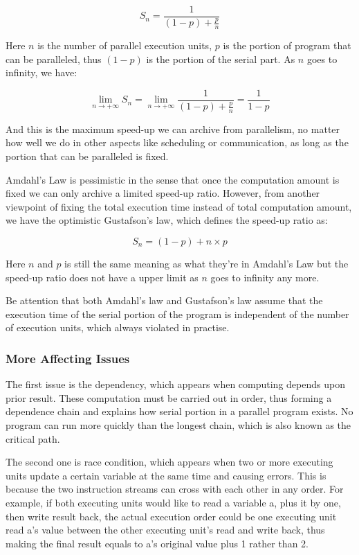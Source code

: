 \documentclass[12pt,a4paper]{report}
\begin{document}
$$ S_n = \frac{1}{(1 - p) + \frac{p}{n}} $$

Here $n$ is the number of parallel execution units, $p$ is the portion of program that can be paralleled, thus $(1-p)$ is the portion of the serial part. As $n$ goes to infinity, we have:

$$ \lim_{n \to +\infty} S_n = \lim_{n \to +\infty} \frac{1}{(1 - p) + \frac{p}{n}} = \frac{1}{1 - p} $$

And this is the maximum speed-up we can archive from parallelism, no matter how well we do in other aspects like scheduling or communication, as long as the portion that can be paralleled is fixed.

Amdahl's Law is pessimistic in the sense that once the computation amount is fixed we can only archive a limited speed-up ratio. However, from another viewpoint of fixing the total execution time instead of total computation amount, we have the optimistic Gustafson's law, which defines the speed-up ratio as:

$$ S_n = (1 - p) + n \times p $$

Here $n$ and $p$ is still the same meaning as what they're in Amdahl's Law but the speed-up ratio does not have a upper limit as $n$ goes to infinity any more.

Be attention that both Amdahl's law and Gustafson's law assume that the execution time of the serial portion of the program is independent of the number of execution units, which always violated in practise.

\subsubsection{More Affecting Issues}

The first issue is the dependency, which appears when computing depends upon prior result. These computation must be carried out in order, thus forming a dependence chain and explains how serial portion in a parallel program exists. No program can run more quickly than the longest chain, which is also known as the critical path.

The second one is race condition, which appears when two or more executing units update a certain variable at the same time and causing errors. This is because the two instruction streams can cross with each other in any order. For example, if both executing units would like to read a variable a, plus it by one, then write result back, the actual execution order could be one executing unit read a's value between the other executing unit's read and write back, thus making the final result equals to a's original value plus 1 rather than 2.
\end{document}
